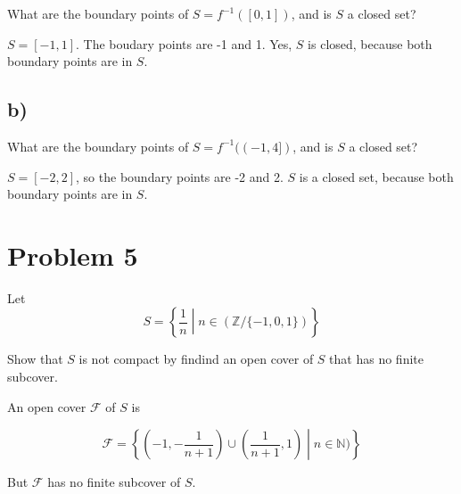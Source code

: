 \documentclass{article}
\begin{document}
What are the boundary points of $S = f^{-1}([0, 1])$, and is $S$ a closed set?

$S = [-1, 1]$. The boudary points are -1 and 1. 
Yes, $S$ is closed, because both boundary points are in $S$.

\subsection*{b)}

What are the boundary points of $S = f^{-1}((-1, 4])$, and is $S$ a closed set?

$S = [-2, 2]$, so the boundary points are -2 and 2. 
$S$ is a closed set, because both boundary points are in $S$. 

\section*{Problem 5}

Let 
\begin{equation*}
        S = \left\{\frac{1}{n}\middle| n \in (\mathbb{Z}/\{-1, 0, 1\})\right\} 
\end{equation*}

Show that $S$ is not compact by findind an open cover of $S$ that has no finite subcover. 

An open cover $\mathcal{F}$ of $S$ is 

\begin{equation*}
        \mathcal{F} = \left\{\left(-1, -\frac{1}{n+1}\right) \cup \left(\frac{1}{n+1}, 1\right)\middle| n \in \mathbb{N})\right\}
\end{equation*}

But $\mathcal{F}$ has no finite subcover of $S$. 
\end{document}
